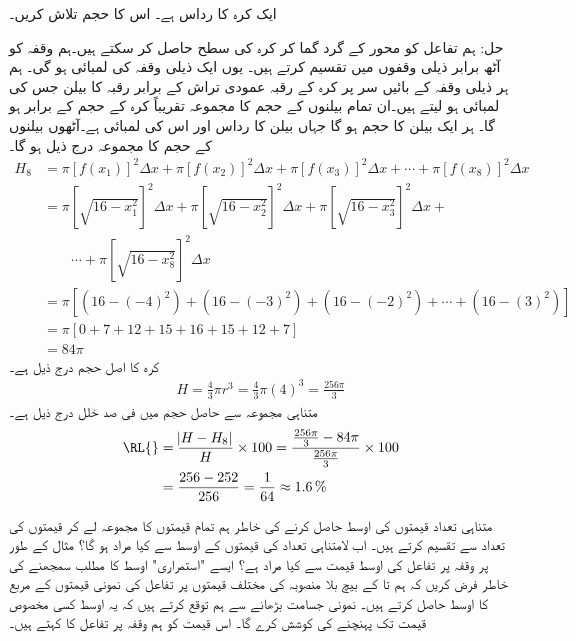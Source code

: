 ایک کرہ کا رداس  ہے۔ اس کا حجم تلاش کریں۔

حل:\quad
ہم تفاعل  کو  محور کے گرد گما کر کرہ کی سطح حاصل کر سکتے ہیں۔ہم وقفہ  کو آٹھ برابر ذیلی وقفوں میں تقسیم کرتے ہیں۔ یوں ایک ذیلی وقفہ کی لمبائی  ہو گی۔ ہم ہر ذیلی وقفہ  کے بائیں سر پر کرہ کے رقبہ عمودی تراش کے برابر رقبہ کا بیلن جس کی لمبائی  ہو لیتے ہیں۔ان تمام بیلنوں  کے حجم کا مجموعہ تقریباً کرہ کے حجم کے برابر ہو گا۔ ہر ایک بیلن کا حجم  ہو گا جہاں بیلن کا رداس  اور اس کی لمبائی  ہے۔آٹھوں بیلنوں کے حجم کا مجموعہ درج ذیل ہو گا۔
\begin{align*}
H_8&=\pi[f(x_1)]^2\Delta x+\pi[f(x_2)]^2\Delta x+\pi[f(x_3)]^2\Delta x+\cdots+\pi[f(x_8)]^2\Delta x\\
&=\pi\left[\sqrt{16-x_1^2}\right]^2\Delta x+\pi\left[\sqrt{16-x_2^2}\right]^2\Delta x+\pi\left[\sqrt{16-x_3^2}\right]^2\Delta x+\\
&\quad\quad\cdots+\pi\left[\sqrt{16-x_8^2}\right]^2\Delta x\\
&=\pi[(16-(-4)^2)+(16-(-3)^2)+(16-(-2)^2)+\cdots+(16-(3)^2)]\\
&=\pi[0+7+12+15+16+15+12+7]\\
&=84\pi
\end{align*}
کرہ کا اصل حجم درج ذیل ہے۔
\begin{align*}
H=\frac{4}{3}\pi r^3=\frac{4}{3}\pi (4)^3=\frac{256\pi}{3}
\end{align*}
متناہی مجموعہ سے حاصل حجم میں فی صد خلل درج ذیل ہے۔
\begin{align*}
\text{\RL{}}&=\frac{\abs{H-H_8}}{H}\times 100=\frac{\tfrac{256\pi}{3}-84\pi}{\tfrac{256\pi}{3}}\times 100\\
&=\frac{256-252}{256}=\frac{1}{64}\approx \SI{1.6}{\percent}
\end{align*}

متناہی تعداد قیمتوں کی اوسط حاصل کرنے کی خاطر ہم تمام قیمتوں کا مجموعہ لے کر قیمتوں کی تعداد سے تقسیم کرتے ہیں۔ اب لامتناہی تعداد کی قیمتوں کے اوسط سے کیا مراد ہو گا؟ مثال کے طور پر وقفہ  پر تفاعل  کی اوسط قیمت سے کیا مراد ہے؟  ایسے "استمراری" اوسط کا مطلب سمجھنے کی خاطر فرض کریں کہ ہم  تا  کے بیچ بلا منصوبہ   کی مختلف قیمتوں پر تفاعل کی نمونی قیمتوں کے مربع کا اوسط حاصل کرتے ہیں۔ نمونی جسامت بڑھانے سے ہم توقع کرتے ہیں کہ یہ اوسط کسی مخصوص قیمت تک پہنچنے کی کوشش کرے گا۔ اس قیمت کو ہم وقفہ  پر تفاعل کا  کہتے ہیں۔


